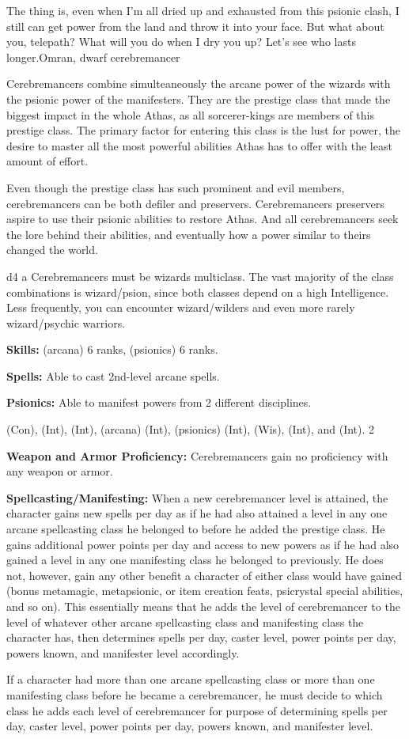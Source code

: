 {The thing is, even when I'm all dried up and exhausted from this psionic clash, I still can get power from the land and throw it into your face. But what about you, telepath? What will you do when I dry you up? Let's see who lasts longer.}{Omran, dwarf cerebremancer}
{Cerebremancers combine simulteaneously the arcane power of the wizards with the psionic power of the manifesters. They are the prestige class that made the biggest impact in the whole Athas, as all sorcerer-kings are members of this prestige class. The primary factor for entering this class is the lust for power, the desire to master all the most powerful abilities Athas has to offer with the least amount of effort.

Even though the prestige class has such prominent and evil members, cerebremancers can be both defiler and preservers. Cerebremancers preservers aspire to use their psionic abilities to restore Athas. And all cerebremancers seek the lore behind their abilities, and eventually how a power similar to theirs changed the world.
}
{d4}
{a}
{Cerebremancers must be wizards multiclass. The vast majority of the class combinations is wizard/psion, since both classes depend on a high Intelligence. Less frequently, you can encounter wizard/wilders and even more rarely wizard/psychic warriors.}
{
\textbf{Skills:}  (arcana) 6 ranks,  (psionics) 6 ranks.

\textbf{Spells:} Able to cast 2nd-level arcane spells.

\textbf{Psionics:} Able to manifest powers from 2 different disciplines.
}
{
 (Con),  (Int),  (Int),  (arcana) (Int),  (psionics) (Int),  (Wis),  (Int), and  (Int).
}
{2}
{}{}
{
\textbf{Weapon and Armor Proficiency:} Cerebremancers gain no proficiency with any weapon or armor.

\textbf{Spellcasting/Manifesting:} When a new cerebremancer level is attained, the character gains new spells per day as if he had also attained a level in any one arcane spellcasting class he belonged to before he added the prestige class. He gains additional power points per day and access to new powers as if he had also gained a level in any one manifesting class he belonged to previously. He does not, however, gain any other benefit a character of either class would have gained (bonus metamagic, metapsionic, or item creation feats, psicrystal special abilities, and so on). This essentially means that he adds the level of cerebremancer to the level of whatever other arcane spellcasting class and manifesting class the character has, then determines spells per day, caster level, power points per day, powers known, and manifester level accordingly.

If a character had more than one arcane spellcasting class or more than one manifesting class before he became a cerebremancer, he must decide to which class he adds each level of cerebremancer for purpose of determining spells per day, caster level, power points per day, powers known, and manifester level.
}
